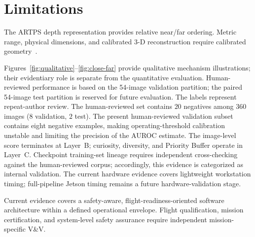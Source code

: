 \section{Limitations}
\label{sec:limitations}
The ARTPS depth representation provides relative near/far ordering.
Metric range, physical dimensions, and calibrated 3-D reconstruction require calibrated
geometry~\citep{ranftl2021dpt,ranftl2022robust}.

Figures~\ref{fig:qualitative}--\ref{fig:close-far} provide qualitative mechanism illustrations;
their evidentiary role is separate from the quantitative evaluation.
Human-reviewed performance is based on the 54-image validation partition; the paired
54-image test partition is reserved for future evaluation.
The labels represent repeat-author review.
The human-reviewed set contains $20$ negatives among $360$ images ($8$ validation,
$2$ test).
The present human-reviewed validation subset contains eight negative
examples, making operating-threshold calibration unstable and limiting the precision of
the AUROC estimate.
The image-level score terminates at Layer~B; curiosity, diversity, and Priority Buffer
operate in Layer~C.
Checkpoint training-set lineage requires independent cross-checking against the
human-reviewed corpus; accordingly, this evidence is categorized as internal validation.
The current hardware evidence covers lightweight workstation timing; full-pipeline Jetson
timing remains a future hardware-validation stage.

Current evidence covers a safety-aware, flight-readiness-oriented software architecture
within a defined operational envelope.
Flight qualification, mission certification, and system-level safety assurance require
independent mission-specific V\&V.
